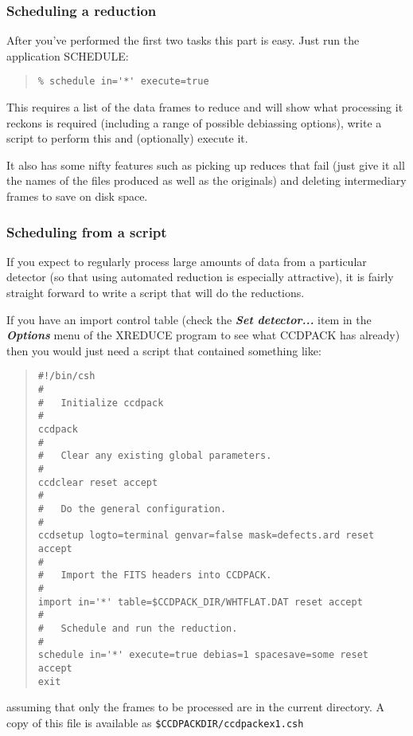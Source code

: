 \documentclass[twoside,11pt]{article}
\newcommand{\htmlref}[2]{#1}
\newcommand{\latexhtml}[2]{#1}
\renewcommand{\_}{\texttt{\symbol{95}}}
\newcommand{\ttsize}{\latexhtml{\small}{}}
\newenvironment{myquote}{\begin{quote}\ttsize}{\end{quote}}
\newcommand{\menu}[1]{{\ttsize \bf \em #1}}
\newcommand{\text}[1]{{\ttsize \tt #1}}
\newcommand{\xroutine}[1]{\htmlref{{\sc #1}}{#1}}
\begin{document}
\subsubsection{\label{scheduling}Scheduling a reduction}
After you've performed the first two tasks this part is easy. Just run the
application \xroutine{SCHEDULE}:
\begin{myquote}
\begin{verbatim}
% schedule in='*' execute=true
\end{verbatim}
\end{myquote}
This requires a list of the data frames to reduce and will show what
processing it reckons is required (including a range of possible
debiassing options), write a script to perform this and (optionally)
execute it.

It also has some nifty features such as picking up reduces that fail
(just give it all the names of the files produced as well as the
originals) and deleting intermediary frames to save on disk space.

\subsubsection{Scheduling from a script}
If you expect to regularly process large amounts of data from
a particular detector (so that using automated reduction is especially
attractive), it is fairly straight forward to write a script that will
do the reductions.

If you have an import control table (check the
\menu{Set detector...} item in the \menu{Options} menu of the
\xroutine{XREDUCE} program to see what CCDPACK has already)
then you would just need a script that contained something like:

\newpage
\begin{center}
\end{center}
\begin{myquote}
\begin{verbatim}
#!/bin/csh
#
#   Initialize ccdpack
#
ccdpack
#
#   Clear any existing global parameters.
#
ccdclear reset accept
#
#   Do the general configuration.
#
ccdsetup logto=terminal genvar=false mask=defects.ard reset accept
#
#   Import the FITS headers into CCDPACK.
#
import in='*' table=$CCDPACK_DIR/WHTFLAT.DAT reset accept
#
#   Schedule and run the reduction.
#
schedule in='*' execute=true debias=1 spacesave=some reset accept
exit
\end{verbatim}
\end{myquote}
assuming that only the frames to be processed are in the current
directory. A copy of this file is available as
\text{\$CCDPACK\_DIR/ccdpack\_ex1.csh}
\end{document}
